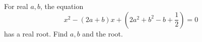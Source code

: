 For real $a,b$, the equation
\[
x^2-(2a+b)x+\left(2a^2+b^2-b+\dfrac{1}{2}\right)=0
\]
has a real root. Find $a,b$ and the root.
